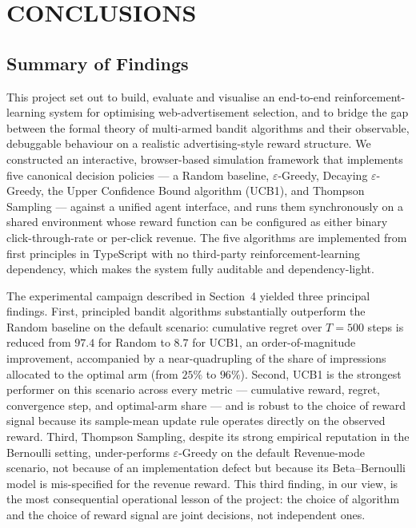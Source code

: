 \section{CONCLUSIONS}

\subsection{Summary of Findings}
This project set out to build, evaluate and visualise an end-to-end reinforcement-learning system for optimising web-advertisement selection, and to bridge the gap between the formal theory of multi-armed bandit algorithms and their observable, debuggable behaviour on a realistic advertising-style reward structure. We constructed an interactive, browser-based simulation framework that implements five canonical decision policies --- a Random baseline, $\varepsilon$-Greedy, Decaying $\varepsilon$-Greedy, the Upper Confidence Bound algorithm (UCB1), and Thompson Sampling --- against a unified agent interface, and runs them synchronously on a shared environment whose reward function can be configured as either binary click-through-rate or per-click revenue. The five algorithms are implemented from first principles in TypeScript with no third-party reinforcement-learning dependency, which makes the system fully auditable and dependency-light.

The experimental campaign described in Section~4 yielded three principal findings. First, principled bandit algorithms substantially outperform the Random baseline on the default scenario: cumulative regret over $T = 500$ steps is reduced from $97.4$ for Random to $8.7$ for UCB1, an order-of-magnitude improvement, accompanied by a near-quadrupling of the share of impressions allocated to the optimal arm (from $25\%$ to $96\%$). Second, UCB1 is the strongest performer on this scenario across every metric --- cumulative reward, regret, convergence step, and optimal-arm share --- and is robust to the choice of reward signal because its sample-mean update rule operates directly on the observed reward. Third, Thompson Sampling, despite its strong empirical reputation in the Bernoulli setting, under-performs $\varepsilon$-Greedy on the default Revenue-mode scenario, not because of an implementation defect but because its Beta--Bernoulli model is mis-specified for the revenue reward. This third finding, in our view, is the most consequential operational lesson of the project: the choice of algorithm and the choice of reward signal are joint decisions, not independent ones.


